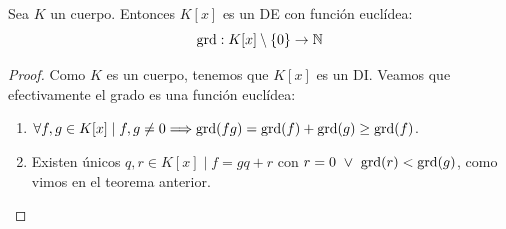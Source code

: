 \begin{coro}
    Sea $K$ un cuerpo. Entonces $K[x]$ es un DE con función euclídea:
    $$\operatorname{grd}:K[x]\setminus\{0\}\rightarrow\mathbb N$$
\end{coro}
\begin{proof}
    Como $K$ es un cuerpo, tenemos que $K[x]$ es un DI. Veamos que efectivamente el grado es una función euclídea:
    
    \begin{enumerate}
        \item $\forall f,g \in K[x] \mid f,g \neq 0 \Longrightarrow \operatorname{grd}(fg) = \operatorname{grd}(f) + \operatorname{grd}(g) \geq \operatorname{grd}(f)$.
        \item Existen únicos $q,r \in K[x] \mid f=gq+r$ con $r=0 \ \lor \  \operatorname{grd}(r)<\operatorname{grd}(g)$, como vimos en el teorema anterior.
    \end{enumerate}
\end{proof}

